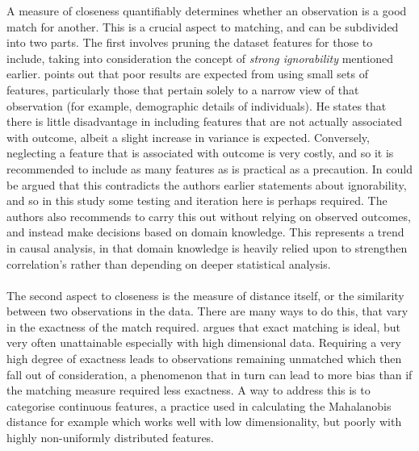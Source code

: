 {\begin {enumerate}
\end{enumerate}
A measure of closeness quantifiably determines whether an observation is a good match for another. This is a crucial aspect to matching, and can be subdivided into two parts. The first involves pruning the dataset features for those to include, taking into consideration the concept of {\it strong ignorability} mentioned earlier. \cite{stuart2010matching} points out that poor results are expected from using small sets of features, particularly those that pertain solely to a narrow view of that observation (for example, demographic details of individuals). He states that there is little disadvantage in including features that are not actually associated with outcome, albeit a slight increase in variance is expected. Conversely, neglecting a feature that is associated with outcome is very costly, and so it is recommended to include as many features as is practical as a precaution. In could be argued that this contradicts the authors earlier statements about ignorability, and so in this study some testing and iteration here is perhaps required. The authors also recommends to carry this out without relying on observed outcomes, and instead make decisions based on domain knowledge. This represents a trend in causal analysis, in that domain knowledge is heavily relied upon to strengthen correlation's rather than depending on deeper statistical analysis. \\\\
The second aspect to closeness is the measure of distance itself, or the similarity between two observations in the data. There are many ways to do this, that vary in the exactness of the match required. \cite{stuart2010matching} argues that exact matching is ideal, but very often unattainable especially with high dimensional data. Requiring a very high degree of exactness leads to observations remaining unmatched which then fall out of consideration, a phenomenon that in turn can lead to more bias than if the matching measure required less exactness. A way to address this is to categorise continuous features, a practice used in calculating the Mahalanobis distance for example which works well with low dimensionality, but poorly with highly non-uniformly distributed features.
\\\\ 
}

